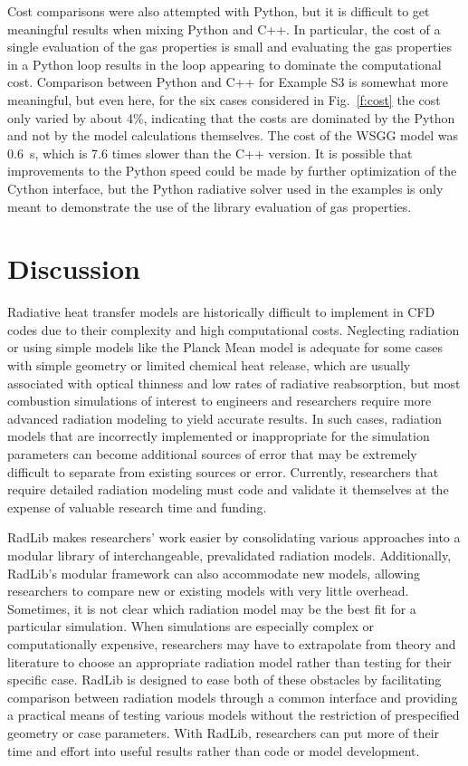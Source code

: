 \documentclass[preprint,12pt]{elsarticle}
\begin{document}
Cost comparisons were also attempted with Python, but it is difficult to get meaningful results when mixing Python and C++. In particular, the cost of a single evaluation of the gas properties is small and evaluating the gas properties in a Python loop results in the loop appearing to dominate the computational cost. Comparison between Python and C++ for Example S3 is somewhat more meaningful, but even here, for the six cases considered in Fig.~\ref{f:cost} the cost only varied by about 4\%, indicating that the costs are dominated by the Python and not by the model calculations themselves. The cost of the WSGG model was 0.6~s, which is 7.6 times slower than the C++ version. It is possible that improvements to the Python speed could be made by further optimization of the Cython interface, but the Python radiative solver used in the examples is only meant to demonstrate the use of the library evaluation of gas properties.


\section{Discussion} \label{s:impact}

Radiative heat transfer models are historically difficult to implement in CFD codes due to their complexity and high computational costs. Neglecting radiation or using simple models like the Planck Mean model is adequate for some cases with simple geometry or limited chemical heat release, which are usually associated with optical thinness and low rates of radiative reabsorption, but most combustion simulations of interest to engineers and researchers require more advanced radiation modeling to yield accurate results. In such cases, radiation models that are incorrectly implemented or inappropriate for the simulation parameters can become additional sources of error that may be extremely difficult to separate from existing sources or error. Currently, researchers that require detailed radiation modeling must code and validate it themselves at the expense of valuable research time and funding. 

RadLib makes researchers' work easier by consolidating various approaches into a modular library of interchangeable, prevalidated radiation models. Additionally, RadLib's modular framework can also accommodate new models, allowing researchers to compare new or existing models with very little overhead. Sometimes, it is not clear which radiation model may be the best fit for a particular simulation. When simulations are especially complex or computationally expensive, researchers may have to extrapolate from theory and literature to choose an appropriate radiation model rather than testing for their specific case. RadLib is designed to ease both of these obstacles by facilitating comparison between radiation models through a common interface and providing a practical means of testing various models without the restriction of prespecified geometry or case parameters. With RadLib, researchers can put more of their time and effort into useful results rather than code or model development. 
\end{document}

